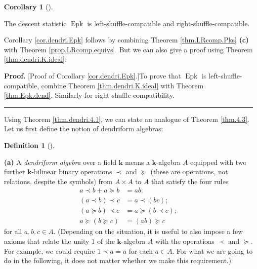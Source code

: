 \documentclass[numbers=enddot,12pt,final,onecolumn,notitlepage]{scrartcl}%
\theoremstyle{definition}
\newtheorem{defi}[theo]{Definition}
\newenvironment{definition}[1][]
{\begin{defi}[#1]\begin{leftbar}}
{\end{leftbar}\end{defi}}
\newtheorem{coro}[theo]{Corollary}
\newenvironment{corollary}[1][]
{\begin{coro}[#1]\begin{leftbar}}
{\end{leftbar}\end{coro}}
\newenvironment{proof}[1][Proof]{\noindent\textbf{#1.} }{\ \rule{0.5em}{0.5em}}
\newenvironment{verlong}{}{}
\begin{document}
\begin{verlong}
\begin{corollary}
\label{cor.dendri.Epk}The descent statistic $\operatorname*{Epk}$ is
left-shuffle-compatible and right-shuffle-compatible.
\end{corollary}

Corollary \ref{cor.dendri.Epk} follows by combining Theorem
\ref{thm.LRcomp.Pks} \textbf{(c)} with Theorem \ref{prop.LRcomp.equivs}. But
we can also give a proof using Theorem \ref{thm.dendri.K.ideal}:

\begin{proof}
[Proof of Corollary \ref{cor.dendri.Epk}.]To prove that $\operatorname*{Epk}$
is left-shuffle-compatible, combine Theorem \ref{thm.dendri.K.ideal} with
Theorem \ref{thm.Epk.dend}. Similarly for right-shuffle-compatibility.
\end{proof}

Using Theorem \ref{thm.dendri.4.1}, we can state an analogue of Theorem
\ref{thm.4.3}. Let us first define the notion of dendriform algebras:

\begin{definition}
\textbf{(a)} A \textit{dendriform algebra} over a field $\mathbf{k}$ means a
$\mathbf{k}$-algebra $A$ equipped with two further $\mathbf{k}$-bilinear
binary operations $\left.  \prec\right.  $ and $\left.  \succeq\right.  $
(these are operations, not relations, despite the symbols) from $A\times A$ to
$A$ that satisfy the four rules%
\begin{align*}
a\left.  \prec\right.  b+a\left.  \succeq\right.  b  &  =ab;\\
\left(  a\left.  \prec\right.  b\right)  \left.  \prec\right.  c  &  =a\left.
\prec\right.  \left(  bc\right)  ;\\
\left(  a\left.  \succeq\right.  b\right)  \left.  \prec\right.  c  &
=a\left.  \succeq\right.  \left(  b\left.  \prec\right.  c\right)  ;\\
a\left.  \succeq\right.  \left(  b\left.  \succeq\right.  c\right)   &
=\left(  ab\right)  \left.  \succeq\right.  c
\end{align*}
for all $a,b,c\in A$. (Depending on the situation, it is useful to also impose
a few axioms that relate the unity $1$ of the $\mathbf{k}$-algebra $A$ with
the operations $\left.  \prec\right.  $ and $\left.  \succeq\right.  $. For
example, we could require $1\left.  \prec\right.  a=a$ for each $a\in A$. For
what we are going to do in the following, it does not matter whether we make
this requirement.)


\end{definition}
\end{verlong}
\end{document}
